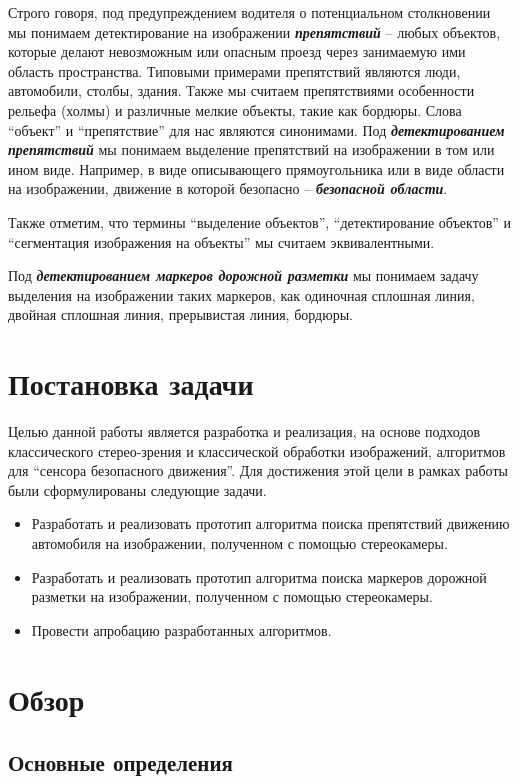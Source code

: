\documentclass[aps,%
14pt,%
final,%
oneside,
onecolumn,%
musixtex, %
superscriptaddress,%
centertags]{extarticle} %
\begin{document}
 Строго говоря, под предупреждением водителя о потенциальном столкновении мы понимаем детектирование на изображении \textit{\textbf{препятствий}} -- любых объектов, которые делают невозможным или опасным проезд через занимаемую ими область пространства. Типовыми примерами препятствий являются люди, автомобили, столбы, здания. Также мы считаем препятствиями особенности рельефа (холмы) и различные мелкие объекты, такие как бордюры. Слова ``объект'' и ``препятствие'' для нас являются синонимами. Под \textit{\textbf{детектированием препятствий}} мы понимаем выделение препятствий на изображении в том или ином виде. Например, в виде описывающего прямоугольника или в виде области на изображении, движение в которой безопасно -- \textit{\textbf{безопасной области}}.

Также отметим, что термины ``выделение объектов'', ``детектирование объектов'' и ``сегментация изображения на объекты'' мы считаем эквивалентными.

Под \textit{\textbf{детектированием маркеров дорожной разметки}} мы понимаем задачу выделения на изображении таких маркеров, как одиночная сплошная линия, двойная сплошная линия, прерывистая линия, бордюры.

\newpage
\section{Постановка задачи}

Целью данной работы является разработка и реализация, на основе подходов классического стерео-зрения и классической обработки изображений, алгоритмов для ``сенсора безопасного движения''.
Для достижения этой цели в рамках работы были сформулированы следующие задачи.
\begin{itemize}
    \item Разработать и реализовать прототип алгоритма поиска препятствий движению автомобиля на изображении, полученном с помощью стереокамеры.
    \item Разработать и реализовать прототип алгоритма поиска маркеров дорожной разметки на изображении, полученном с помощью стереокамеры.
    \item Провести апробацию разработанных алгоритмов.
\end{itemize}

\newpage
\section{Обзор}

\subsection{Основные определения}
\end{document}
